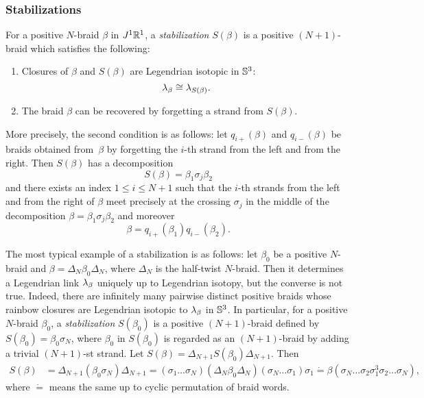 \subsubsection{Stabilizations}
For a positive $N$-braid $\beta$ in $J^1\mathbb{R}^1$, a \emph{stabilization} $S(\beta)$ is a positive $(N+1)$-braid which satisfies the following:
\begin{enumerate}
\item Closures of $\beta$ and $S(\beta)$ are Legendrian isotopic in $\mathbb{S}^3$:
\[
\lambda_\beta \cong \lambda_{S(\beta)}.
\]
\item The braid $\beta$ can be recovered by forgetting a strand from $S(\beta)$.
\end{enumerate}
More precisely, the second condition is as follows:
let $q_{i+}(\beta)$ and $q_{i-}(\beta)$ be braids obtained from~$\beta$ by forgetting the $i$-th strand from the left and from the right.
Then $S(\beta)$ has a decomposition
\[
S(\beta)=\beta_1\sigma_j\beta_2
\]
and there exists an index $1\le i\le N+1$ such that the $i$-th strands from the left and from the right of $\beta$ meet precisely at the crossing $\sigma_j$ in the middle of the decomposition $\beta=\beta_1\sigma_j\beta_2$ and moreover
\[
\beta= q_{i+}(\beta_1) q_{i-}(\beta_2).
\]

The most typical example of a stabilization is as follows:
let $\beta_0$ be a positive $N$-braid and $\beta=\Delta_N\beta_0\Delta_N$, where $\Delta_N$ is the half-twist $N$-braid.
Then it determines a Legendrian link $\lambda_\beta$ uniquely up to Legendrian isotopy, but the converse is not true.
Indeed, there are infinitely many pairwise distinct positive braids whose rainbow closures are Legendrian isotopic to $\lambda_\beta$ in $\mathbb{S}^3$.
In particular, for a positive $N$-braid $\beta_0$, a \emph{stabilization} $S(\beta_0)$ is a positive $(N+1)$-braid defined by
$S(\beta_0) = \beta_0\sigma_N$, where $\beta_0$ in $S(\beta_0)$ is regarded as an $(N+1)$-braid by adding a trivial $(N+1)$-st strand.
Let $S(\beta) = \Delta_{N+1}S(\beta_0)\Delta_{N+1}$. Then 
\begin{align*}
S(\beta) &= \Delta_{N+1} (\beta_0 \sigma_N) \Delta_{N+1}
=(\sigma_1\dots\sigma_N) (\Delta_N \beta_0 \Delta_N) (\sigma_N\dots\sigma_1) \sigma_1
\mathrel{\dot{=}} \beta (\sigma_N\dots\sigma_2\sigma_1^3\sigma_2\dots\sigma_N),
\end{align*}
where $\mathrel{\dot{=}}$ means the same up to cyclic permutation of braid words.


